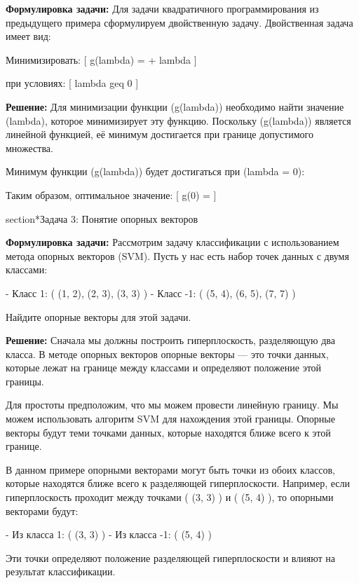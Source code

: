 \textbf{Формулировка задачи:} Для задачи квадратичного программирования из предыдущего примера сформулируем двойственную задачу. Двойственная задача имеет вид:

Минимизировать:
[
g(lambda) =  + lambda
]

при условиях:
[
lambda geq 0
]

\textbf{Решение:} Для минимизации функции (g(lambda)) необходимо найти значение (lambda), которое минимизирует эту функцию. Поскольку (g(lambda)) является линейной функцией, её минимум достигается при границе допустимого множества.

Минимум функции (g(lambda)) будет достигаться при (lambda = 0):

Таким образом, оптимальное значение:
[
g(0) = 
]

section*{Задача 3: Понятие опорных векторов}

\textbf{Формулировка задачи:} Рассмотрим задачу классификации с использованием метода опорных векторов (SVM). Пусть у нас есть набор точек данных с двумя классами:

- Класс 1: ( (1, 2), (2, 3), (3, 3) )
- Класс -1: ( (5, 4), (6, 5), (7, 7) )

Найдите опорные векторы для этой задачи.

\textbf{Решение:} Сначала мы должны построить гиперплоскость, разделяющую два класса. В методе опорных векторов опорные векторы — это точки данных, которые лежат на границе между классами и определяют положение этой границы.

Для простоты предположим, что мы можем провести линейную границу. Мы можем использовать алгоритм SVM для нахождения этой границы. Опорные векторы будут теми точками данных, которые находятся ближе всего к этой границе.

В данном примере опорными векторами могут быть точки из обоих классов, которые находятся ближе всего к разделяющей гиперплоскости. Например, если гиперплоскость проходит между точками ( (3, 3) ) и ( (5, 4) ), то опорными векторами будут:

- Из класса 1: ( (3, 3) )
- Из класса -1: ( (5, 4) )

Эти точки определяют положение разделяющей гиперплоскости и влияют на результат классификации.
